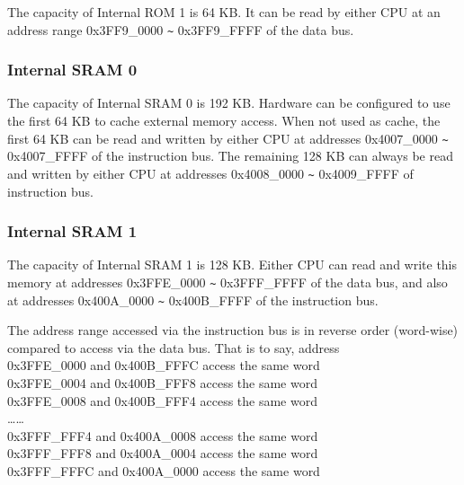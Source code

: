\documentclass[main\_\_EN.tex]{subfiles}
\begin{document}
The capacity of Internal ROM 1 is 64 KB. It can be read by either CPU at an address range 0x3FF9\_0000 \verb+~+ 0x3FF9\_FFFF of the data bus.


\subsubsection{Internal SRAM 0}
\hypertarget{Cache}{}
The capacity of Internal SRAM 0 is 192 KB. Hardware can be configured to use the first 64 KB to cache external memory access. When not used as cache, the first 64 KB can be read and written by either CPU at addresses 0x4007\_0000 \verb+~+ 0x4007\_FFFF of the instruction bus. The remaining 128 KB can always be read and written by either CPU at addresses 0x4008\_0000 \verb+~+ 0x4009\_FFFF of instruction bus.

\subsubsection{Internal SRAM 1}

The capacity of Internal SRAM 1 is 128 KB. Either CPU can read and write this memory at addresses 0x3FFE\_0000 \verb+~+ 0x3FFF\_FFFF of the data bus, and also at addresses 0x400A\_0000 \verb+~+ 0x400B\_FFFF of the instruction bus.

The address range accessed via the instruction bus is in reverse order (word-wise) compared to access via the data bus. That is to say, address \\
0x3FFE\_0000 and 0x400B\_FFFC access the same word\\
0x3FFE\_0004 and 0x400B\_FFF8 access the same word\\
0x3FFE\_0008 and 0x400B\_FFF4 access the same word\\
……\\
0x3FFF\_FFF4 and 0x400A\_0008 access the same word\\
0x3FFF\_FFF8 and 0x400A\_0004 access the same word\\
0x3FFF\_FFFC and 0x400A\_0000 access the same word
\end{document}
